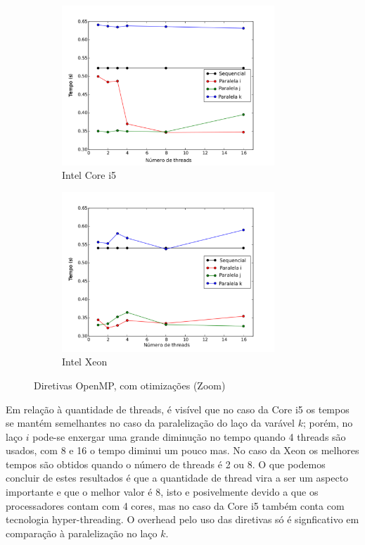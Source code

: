 \documentclass[a4paper,12pt,fleqn]{article}
\begin{document}
\begin{figure} 
    \centering
    \begin{subfigure}{.5\textwidth}
        \centering
        \includegraphics[height=6cm]{Images/corei5cozoom} 
        \caption{Intel Core i5}
        \label{fig:corei5cozoom} 
    \end{subfigure}%
    \begin{subfigure}{.5\textwidth}
        \centering
        \includegraphics[height=6cm]{Images/xeoncozoom} 
        \caption{Intel Xeon}
        \label{fig:xeoncozoom} 
    \end{subfigure}    
    \caption{Diretivas OpenMP, com otimizações (Zoom)}
    \label{fig:cozoom}
\end{figure} 

Em relação à quantidade de threads, é visível que no caso da Core i5 os tempos se mantém semelhantes no caso da paralelização do laço da varável $k$; porém, no laço $i$ pode-se enxergar uma grande diminução no tempo quando 4 threads são usados, com 8 e 16 o tempo diminui um pouco mas. No caso da Xeon os melhores tempos são obtidos quando o número de threads é 2 ou 8. O que podemos concluir de estes resultados é que a quantidade de thread vira a ser um aspecto importante e que o melhor valor é 8, isto e posivelmente devido a que os processadores contam com 4 cores, mas no caso da Core i5  também conta com tecnologia hyper-threading. O overhead pelo uso das diretivas só é signficativo em comparação à paralelização no laço $k$.
\end{document}
